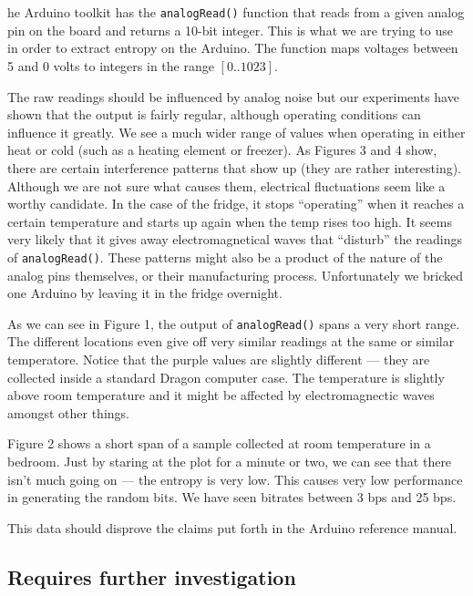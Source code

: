 \documentclass[a4paper]{article}           %
\newcommand{\tmpsection}[1]{}
\let\tmpsection=\section
\renewcommand{\section}[2]{

    \ifthenelse{
      \equal{#2}{Heimildir} %
    }
    {
      \tmpsection{\sc{#1} }
      \tmpsection{\sc{#2} }
    }
    {\tmpsection{\sc{#1} } }
      

}
\begin{document}
\section{Attempts at harvesting entropy}

The Arduino toolkit has the \texttt{analogRead()} function that reads from a given analog pin on the board and returns a 10-bit integer. This is what we are trying to use in order to extract entropy on the Arduino. The function maps voltages between 5 and 0 volts to integers in the range $[0..1023]$. 

The raw readings should be influenced by analog noise but our experiments have shown that the output is fairly regular, although operating conditions can influence it greatly. We see a much wider range of values when operating in either heat or cold (such as a heating element or freezer). As Figures 3 and 4 show, there are certain interference patterns that show up (they are rather interesting). Although we are not sure what causes them, electrical fluctuations seem like a worthy candidate. In the case of the fridge, it stops ``operating'' when it reaches a certain temperature and starts up again when the temp rises too high. It seems very likely that it gives away electromagnetical waves that ``disturb'' the readings of \texttt{analogRead()}. These patterns might also be a product of the nature of the analog pins themselves, or their manufacturing process. Unfortunately we bricked one Arduino by leaving it in the fridge overnight. 


As we can see in Figure 1, the output of \texttt{analogRead()} spans a very short range. The different locations even give off very similar readings at the same or similar temperatore. Notice that the purple values are slightly different --- they are collected inside a standard Dragon computer case. The temperature is slightly above room temperature and it might be affected by electromagnectic waves amongst other things. 

Figure 2 shows a short span of a sample collected at room temperature in a bedroom. Just by staring at the plot for a minute or two, we can see that there isn't much going on --- the entropy is very low. This causes very low performance in generating the random bits. We have seen bitrates between 3 bps and 25 bps. 

This data should disprove the claims put forth in the Arduino reference manual. 

\subsection{Requires further investigation}
\end{document}
